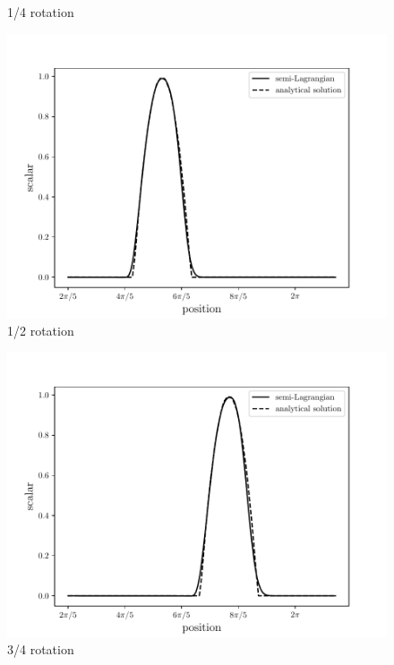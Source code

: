 \begin{frame}
\begin{center}
\begin{figure}[H]
\begin{minipage}{.5\linewidth}
      \tiny 1/4 rotation
     \end{minipage}
     \begin{minipage}{.5\linewidth}
      \centering
      \includegraphics[scale=0.33]{./images/SLquad2.pdf}\\
      \tiny 1/2 rotation
     \end{minipage}%
     \begin{minipage}{.5\linewidth}
      \centering
      \includegraphics[scale=0.33]{./images/SLquad3.pdf}\\
      \tiny 3/4 rotation
     \end{minipage}
\end{figure}
\end{center}
\end{frame} 



